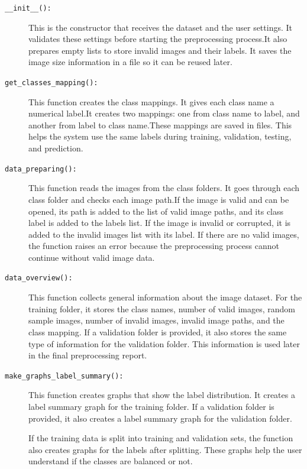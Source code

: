\documentclass[12pt,a4paper]{report}
\begin{document}
\begin{description}
    \item[\texttt{\_\_init\_\_():}]
    This is the constructor that receives the dataset and the user settings. 
    It validates these settings before starting the preprocessing process.It also prepares empty lists to store invalid images and their labels.
    It saves the image size information in a file so it can be reused later.

    \item[\texttt{get\_classes\_mapping():}]
    This function creates the class mappings. It gives each class name a numerical label.It creates two mappings:
    one from class name to label, and another from label to class name.These mappings are saved in files. This helps the system use the same labels during
    training, validation, testing, and prediction.

    \item[\texttt{data\_preparing():}]
    This function reads the images from the class folders. It goes through each class
    folder and checks each image path.If the image is valid and can be opened, its path is added to the list of valid image
    paths, and its class label is added to the labels list. If the image is invalid or
    corrupted, it is added to the invalid images list with its label.
    If there are no valid images, the function raises an error because the preprocessing
    process cannot continue without valid image data.

    \item[\texttt{data\_overview():}]
    This function collects general information about the image dataset. For the training
    folder, it stores the class names, number of valid images, random sample images,
    number of invalid images, invalid image paths, and the class mapping.
    If a validation folder is provided, it also stores the same type of information for
    the validation folder. This information is used later in the final preprocessing
    report.

    \item[\texttt{make\_graphs\_label\_summary():}]
    This function creates graphs that show the label distribution. It creates a label
    summary graph for the training folder. If a validation folder is provided, it also
    creates a label summary graph for the validation folder.

    If the training data is split into training and validation sets, the function also
    creates graphs for the labels after splitting. These graphs help the user understand
    if the classes are balanced or not.


\end{description}
\end{document}
